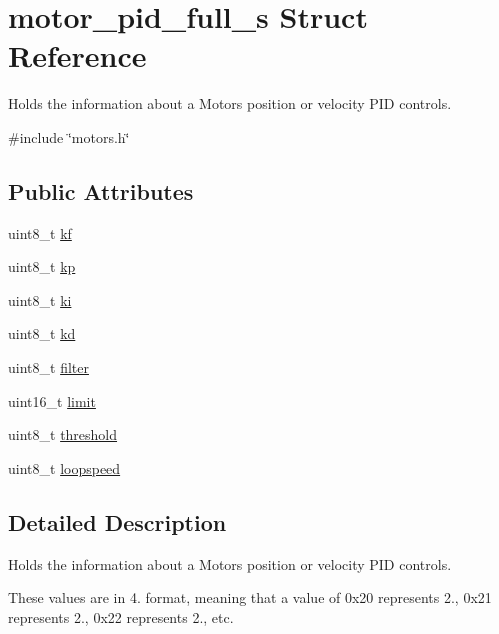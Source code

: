 \hypertarget{structmotor__pid__full__s}{}\section{motor\+\_\+pid\+\_\+full\+\_\+s Struct Reference}
\label{structmotor__pid__full__s}


Holds the information about a Motor\textquotesingle{}s position or velocity P\+ID controls.  




{\ttfamily \#include \char`\"{}motors.\+h\char`\"{}}

\subsection*{Public Attributes}
\begin{DoxyCompactItemize}
\item 
uint8\+\_\+t \hyperlink{structmotor__pid__full__s_aca37978c9743342bf520dcadf2eed67c}{kf}
\item 
uint8\+\_\+t \hyperlink{structmotor__pid__full__s_a5c90af94c336d26a8ecdd4b88f06c9d9}{kp}
\item 
uint8\+\_\+t \hyperlink{structmotor__pid__full__s_ad6800234728012e59dc6c945cc6465d5}{ki}
\item 
uint8\+\_\+t \hyperlink{structmotor__pid__full__s_a02e542bcec0f870af870cd37a4e2a922}{kd}
\item 
uint8\+\_\+t \hyperlink{structmotor__pid__full__s_af6f15fc8e1a49098f69aba255a3b21c6}{filter}
\item 
uint16\+\_\+t \hyperlink{structmotor__pid__full__s_a98141ce9bce70a500cf18c7a92d866c5}{limit}
\item 
uint8\+\_\+t \hyperlink{structmotor__pid__full__s_a50b463b6ffd906bfef9ae1edc7cc872e}{threshold}
\item 
uint8\+\_\+t \hyperlink{structmotor__pid__full__s_a567385b82081690c526a618b2110e030}{loopspeed}
\end{DoxyCompactItemize}


\subsection{Detailed Description}
Holds the information about a Motor\textquotesingle{}s position or velocity P\+ID controls. 

These values are in 4. format, meaning that a value of 0x20 represents 2., 0x21 represents 2., 0x22 represents 2., etc. 

